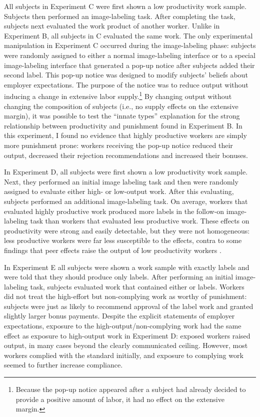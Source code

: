 \documentclass[12pt]{article}
\begin{document}
All subjects in Experiment C were first shown a low productivity work
sample. Subjects then performed an image-labeling task. After
completing the task, subjects next evaluated the work product of
another worker. Unlike in Experiment B, all subjects in C evaluated
the same work. The only experimental manipulation in Experiment C
occurred during the image-labeling phase: subjects were randomly
assigned to either a normal image-labeling interface or to a special
image-labeling interface that generated a pop-up notice after subjects
added their second label. This pop-up notice was designed to modify
subjects' beliefs about employer expectations. The purpose of the
notice was to reduce output without inducing a change in extensive
labor supply.\footnote{Because the pop-up notice appeared after a
  subject had already decided to provide a positive amount of labor,
  it had no effect on the extensive margin.} By changing output
without changing the composition of subjects (i.e., no supply effects
on the extensive margin), it was possible to test the ``innate types''
explanation for the strong relationship between productivity and
punishment found in Experiment B. In this experiment, I found no
evidence that highly productive workers are simply more punishment
prone: workers receiving the pop-up notice reduced their output,
decreased their rejection recommendations and increased their bonuses.

In Experiment D, all subjects were first shown a low productivity work
sample. Next, they performed an initial image labeling task and then
were randomly assigned to evaluate either high- or low-output
work. After this evaluating, subjects performed an additional
image-labeling task. On average, workers that evaluated highly
productive work produced more labels in the follow-on image-labeling
task than workers that evaluated less productive work. These effects
on productivity were strong and easily detectable, but they were not
homogeneous: less productive workers were far less susceptible to the
effects, contra to some findings that peer effects raise the output of
low productivity workers \citep{falk2006clean,mas2009peers}.

In Experiment E all subjects were shown a work sample with exactly 
labels and were told that they should produce only  labels. After
performing an initial image-labeling task, subjects evaluated work
that contained either  or  labels. Workers did not treat the
high-effort but non-complying work as worthy of punishment: subjects
were just as likely to recommend approval of the  label work and
granted slightly larger bonus payments. Despite the explicit
statements of employer expectations, exposure to the
high-output/non-complying work had the same effect as exposure to
high-output work in Experiment D: exposed workers raised output, in
many cases beyond the clearly communicated ceiling. However, most
workers complied with the standard initially, and exposure to
complying work seemed to further increase compliance.
\end{document}
